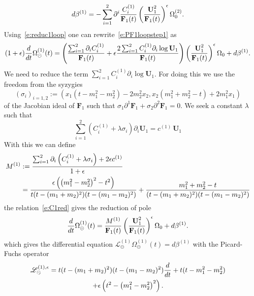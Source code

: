 \documentclass[a4paper,12pt]{article}
\numberwithin{equation}{section}
\numberwithin{figure}{section}
\def\su{\circleddash}
\begin{document}
\begin{equation}
  d\beta^{(1)}=- \sum_{i=1}^2 \partial^i  { C_i^{(1)}  \over
    \textbf{F}_1(t) } \left(\textbf{U}_1^2\over
    \textbf{F}_1(t)\right)^\epsilon\Omega_0^{(2)}.
\end{equation}
Using~\eqref{e:reduc1loop} one can rewrite~\eqref{e:PF1loopstep1} as
\begin{equation}
(1+\epsilon) {d\over dt}
 \Omega^{(1)}_\su(t)=
 \left({\sum_{i=1}^2 \partial_i C_i^{(1)}\over
     \textbf{F}_1(t)}+\epsilon{2\sum_{i=1}^2 C_i^{(1)}\partial_i
     \log \textbf{U}_1\over \textbf{F}_1(t)}\right)\left(\textbf{U}_1^2\over \textbf{F}_1(t)\right)^\epsilon \Omega_0+d\beta^{(1)}.
\end{equation}
We need to reduce the term $\sum_{i=1}^2 C_i^{(1)}\partial_i
     \log \textbf{U}_1$. For doing this we use the freedom from the
     syzygies
     \begin{equation}
       (\sigma_i)_{i=1,2}:=(x_1 \left(t-m_{1}^2-m_{2}^2\right)-2 m_{2}^2 x_2,x_2
       \left(m_{1}^2+m_{2}^2-t\right)+2 m_{1}^2 x_1)
     \end{equation}
     of the Jacobian ideal
   of $\textbf{F}_1$ such that $\sigma_1 \partial^1
   \textbf{F}_1+\sigma_2\partial^2 \textbf{F}_1=0$.
We seek a constant $\lambda$ such that
\begin{equation}\label{e:C1red}
  \sum_{i=1}^2 \left(C_i^{(1)}+ \lambda
      \sigma_i
  \right)  \partial_i \textbf{U}_1 = c^{(1)}\, \textbf{U}_1
\end{equation}
%
With this we can define 
\begin{align}
  \label{e:M1}
  M^{(1)}&:={\sum_{i=1}^2 \partial_i \left(C_i^{(1)}+\lambda
      \sigma_i
  \right) +2\epsilon
  c^{(1)}\over 1+\epsilon}\\
\nonumber &=\frac{\epsilon  \left(\left(m_{1}^2-m_{2}^2\right)^2-t^2\right)}{t
  (t-(m_1+m_2)^2)(t-(m_1-m_2)^2)}+\frac{m_{1}^2+m_{2}^2-t}{ (t-(m_1+m_2)^2)(t-(m_1-m_2)^2)}
\end{align}
the relation~\eqref{e:C1red} gives the reduction of pole
\begin{equation}
 {d\over dt}
 \Omega^{(1)}_\su(t)=
{M^{(1)}\over
    \textbf{F}_1(t)}\left(\textbf{U}_1^2\over \textbf{F}_1(t)\right)^\epsilon \Omega_0+d\beta^{(1)}.
\end{equation}
%
 which gives the differential equation $ \mathscr{L}_\su^{(1)}
 \Omega^{(1)}_\su(t) =d\beta^{(1)}$ with the Picard-Fuchs operator
 \begin{multline}\label{e:PF1loopresult}
\mathscr{L}_\su^{(1),\epsilon} =t
  (t-(m_1+m_2)^2)(t-(m_1-m_2)^2) {d\over dt}+t(t-m_{1}^2-m_{2}^2)\cr+\epsilon \left(t^2-\left(m_{1}^2-m_{2}^2\right)^2\right).
\end{multline}
\end{document}
